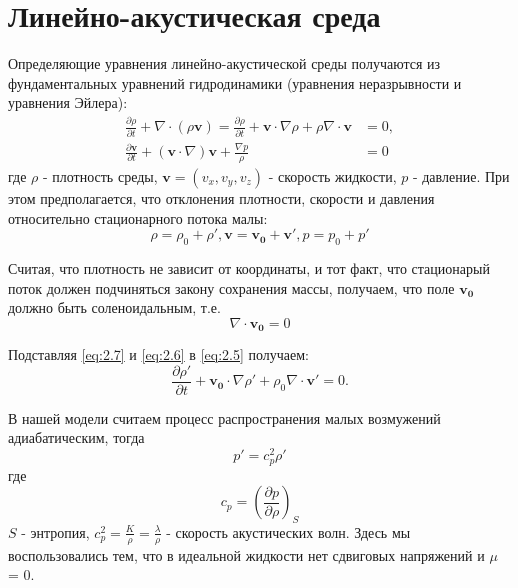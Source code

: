 \documentclass[12pt,a4paper, titlepage, openany]{book}
\begin{document}
\section{Линейно-акустическая среда}
\par
Определяющие уравнения линейно-акустической среды получаются из фундаментальных уравнений гидродинамики (уравнения неразрывности и уравнения Эйлера):
\begin{equation}
\label{eq:2.5}
\begin{aligned}
\frac{\partial \rho}{\partial t} + \nabla \cdot (\rho \mathbf{v}) = \frac{\partial \rho}{\partial t} + \mathbf{v} \cdot \nabla \rho + \rho \nabla \cdot \mathbf{v} &= 0, \\
\frac{\partial \mathbf{v}}{\partial t} + (\mathbf{v} \cdot \nabla) \mathbf{v} + \frac{\nabla p}{\rho} &= 0
\end{aligned}
\end{equation}
где $\rho$ - плотность среды, $\mathbf{v} = (v_x, v_y, v_z)$ - скорость жидкости, $p$ - давление. При этом предполагается, что отклонения плотности, скорости и давления относительно стационарного потока малы:
\begin{equation}
\label{eq:2.6}
\rho = \rho_0 + \rho', \mathbf{v} = \mathbf{v_0} + \mathbf{v'}, p = p_0 + p'
\end{equation}
\par
Считая, что плотность не зависит от координаты, и тот факт, что стационарый поток должен подчиняться закону сохранения массы, получаем, что поле $\mathbf{v_0}$ должно быть соленоидальным, т.е.
\begin{equation}
\label{eq:2.7}
\nabla \cdot \mathbf{v_0} = 0
\end{equation}
\par
Подставляя \ref{eq:2.7} и \ref{eq:2.6} в \ref{eq:2.5} получаем:
\begin{equation}
\frac{\partial \rho '}{\partial t} + \mathbf{v_0} \cdot \nabla \rho' + \rho_0 \nabla \cdot \mathbf{v'} = 0.
\end{equation}
\par
В нашей модели считаем процесс распространения малых возмужений адиабатическим, тогда 
\begin{equation}
p' = c^2_p \rho' 
\end{equation}
где
\begin{equation}
c_p = (\frac{\partial p}{\partial \rho})_S
\end{equation}
$S$ - энтропия, $c^2_p = \frac{K}{\rho} = \frac{\lambda}{\rho}$ - скорость акустических волн. Здесь мы воспользовались тем, что в идеальной жидкости нет сдвиговых напряжений и $\mu$ = 0.
\end{document}

